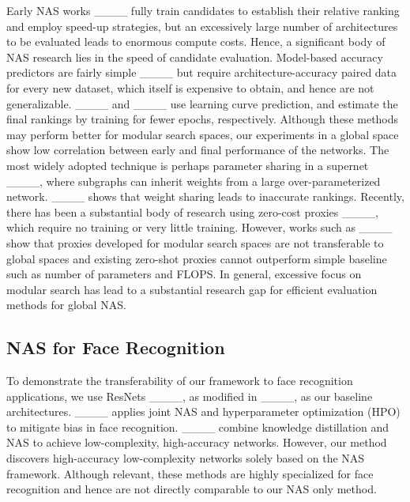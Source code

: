 Early NAS works ____ fully train candidates to establish their relative ranking and employ speed-up strategies, but an excessively large number of architectures to be evaluated leads to enormous compute costs. Hence, a significant body of NAS research lies in the speed of candidate evaluation. Model-based accuracy predictors are fairly simple ____ but require architecture-accuracy paired data for every new dataset, which itself is expensive to obtain, and hence are not generalizable. ____ and ____ use learning curve prediction, and estimate the final rankings by training for fewer epochs, respectively. Although these methods may perform better for modular search spaces, our experiments in a global space show low correlation between early and final performance of the networks. The most widely adopted technique is perhaps parameter sharing in a supernet ____, where subgraphs can inherit weights from a large over-parameterized network. ____ shows that weight sharing leads to inaccurate rankings. Recently, there has been a substantial body of research using zero-cost proxies ____, which require no training or very little training. However, works such as ____ show that proxies developed for modular search spaces are not transferable to global spaces and existing zero-shot proxies cannot outperform simple baseline such as number of parameters and FLOPS. In general, excessive focus on modular search has lead to a substantial research gap for efficient evaluation methods for global NAS.

\subsection{NAS for Face Recognition}

To demonstrate the transferability of our framework to face recognition applications, we use ResNets ____, as modified in ____, as our baseline architectures. ____ applies joint NAS and hyperparameter optimization (HPO) to mitigate bias in face recognition. ____ combine knowledge distillation and NAS to achieve low-complexity, high-accuracy networks. However, our method discovers high-accuracy low-complexity networks solely based on the NAS framework. Although relevant, these methods are highly specialized for face recognition and hence are not directly comparable to our NAS only method.    
